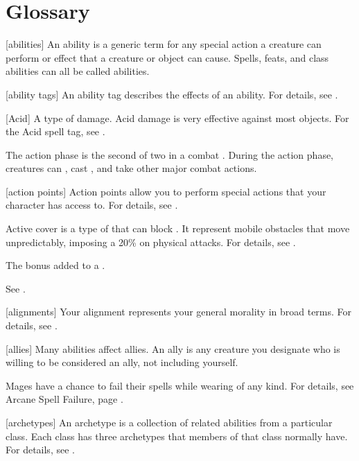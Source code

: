 \chapter{Glossary}\label{Glossary}

[abilities] An ability is a generic term for any special action a creature can perform or effect that a creature or object can cause. Spells, feats, and class abilities can all be called abilities.

[ability tags] An ability tag describes the effects of an ability.
For details, see .

[Acid] A type of damage. Acid damage is very effective against most objects. For the Acid spell tag, see .

 The action phase is the second of two  in a combat .
During the action phase, creatures can , cast , and take other major combat actions.

[action points] Action points allow you to perform special actions that your character has access to.
For details, see .

 Active cover is a type of  that can block .
It represent mobile obstacles that move unpredictably, imposing a 20\%  on physical attacks.
For details, see .

 The bonus added to a .

 See .

[alignments] Your alignment represents your general morality in broad terms.
For details, see .

[allies] Many abilities affect allies.
An ally is any creature you designate who is willing to be considered an ally, not including yourself.

 Mages have a chance to fail their spells while wearing  of any kind.
For details, see Arcane Spell Failure, page .

[archetypes] An archetype is a collection of related abilities from a particular class.
Each class has three archetypes that members of that class normally have.
For details, see .

